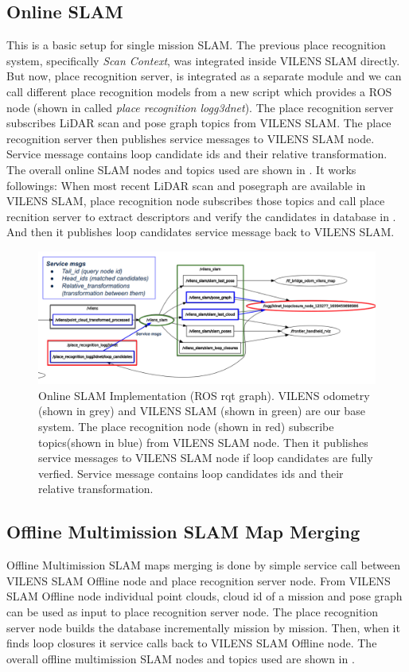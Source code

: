 \subsection{Online SLAM}
This is a basic setup for single mission SLAM. The previous place recognition system, specifically \emph{Scan Context}, was integrated inside VILENS SLAM directly. But now, place recognition server, is integrated as a separate module and we can call different place recognition models from a new script which provides a ROS node (shown in  called \emph{place recognition logg3dnet}). The place recognition server subscribes LiDAR scan and pose graph topics from VILENS SLAM. The place recognition server then publishes service messages to VILENS SLAM node. Service message contains loop candidate ids and their relative transformation. The overall online SLAM nodes and topics used are shown in . 
It works followings: When most recent LiDAR scan and posegraph are available in VILENS SLAM, place recognition node subscribes those topics and call place recnition server to extract descriptors and verify the candidates in database in . And then it publishes loop candidates service message back to VILENS SLAM. 

\begin{figure}[t]
  \centering
  \includegraphics[width=0.99\columnwidth]{pics/Implementation_Online_SLAM2.png}
  \caption{Online SLAM Implementation (ROS rqt graph). VILENS odometry (shown in grey) and VILENS SLAM (shown in green) are our base system. The place recognition node (shown in red) subscribe topics(shown in blue) from VILENS SLAM node. Then it publishes service messages to VILENS SLAM node if loop candidates are fully verfied. Service message contains loop candidates ids and their relative transformation.}
  \label{fig:implementation_online_slam}
\end{figure}


\subsection{Offline Multimission SLAM Map Merging}
Offline Multimission SLAM maps merging is done by simple service call between VILENS SLAM Offline node and place recognition server node. From VILENS SLAM Offline node individual point clouds, cloud id of a mission and pose graph can be used as input to place recognition server node. The place recognition server node builds the database incrementally mission by mission. Then, when it finds loop closures it service calls back to VILENS SLAM Offline node. The overall offline multimission SLAM nodes and topics used are shown in .  

